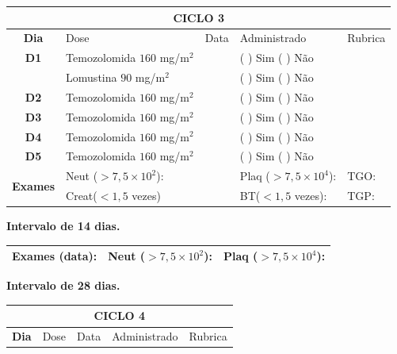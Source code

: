 \documentclass[11pt,a4paper,oldfontcommands]{memoir}
\begin{document}
\begin{center}
\begin{table}[H]
\begin{tabular}{p{1cm}p{5cm}|p{1cm}|p{4.5cm}|p{2cm}}
	\hline
	\multicolumn{5}{c}{\textbf{CICLO 3}}\\
\hline
    \multicolumn{1}{c|}{\multirow{1}{*}{\textbf{Dia}}}&{Dose}&{Data}&{Administrado}&{Rubrica} \\
    \hline
    \multicolumn{1}{c|}{\multirow{1}{*}{\textbf{D1}}}&{Temozolomida \(160\) mg/m\(^2\)}&&{(  ) Sim (  ) Não}&\\
    \multicolumn{1}{c|}{\multirow{1}{*}{\textbf{}}}&{Lomustina \(90\) mg/m\(^2\)}&&{(  ) Sim (  ) Não}&\\
    \multicolumn{1}{c|}{\multirow{1}{*}{\textbf{D2}}}&{Temozolomida \(160\) mg/m\(^2\)}&&{(  ) Sim (  ) Não}&\\
    \multicolumn{1}{c|}{\multirow{1}{*}{\textbf{D3}}}&{Temozolomida \(160\) mg/m\(^2\)}&&{(  ) Sim (  ) Não}&\\
    \multicolumn{1}{c|}{\multirow{1}{*}{\textbf{D4}}}&{Temozolomida \(160\) mg/m\(^2\)}&&{(  ) Sim (  ) Não}&\\
    \multicolumn{1}{c|}{\multirow{1}{*}{\textbf{D5}}}&{Temozolomida \(160\) mg/m\(^2\)}&&{(  ) Sim (  ) Não}&\\
    \hline
    \multicolumn{1}{c|}{\multirow{2}{*}{\textbf{Exames}}}&\multicolumn{2}{l|}{Neut (\(>7,5\times10^2\)):}&{Plaq (\(>7,5\times10^4\)):}&{TGO:}\\
    \cline{2-5}
    \multicolumn{1}{c|}{\multirow{2}{*}{{}}}&\multicolumn{2}{l|}{Creat(\(<1,5\) vezes)}&{BT(\(<1,5\) vezes):}&{TGP:}
    \\
    \hline
\end{tabular}
\end{table}
\textbf{Intervalo de 14 dias.}
\begin{table}[H]
\begin{tabular}{p{5cm}|p{5cm}|p{4.7cm}}
    \hline
    \textbf{Exames (data):}&{Neut (\(>7,5\times10^2\)):}&{Plaq (\(>7,5\times10^4\)):}
    \\
    \hline
\end{tabular}
\end{table}
\textbf{Intervalo de 28 dias.}
\begin{table}[H]
\begin{tabular}{p{1cm}p{5cm}|p{1cm}|p{4.5cm}|p{2cm}}
	\hline
	\multicolumn{5}{c}{\textbf{CICLO 4}}\\
\hline
    \multicolumn{1}{c|}{\multirow{1}{*}{\textbf{Dia}}}&{Dose}&{Data}&{Administrado}&{Rubrica} \\

\end{tabular}
\end{table}
\end{center}
\end{document}
